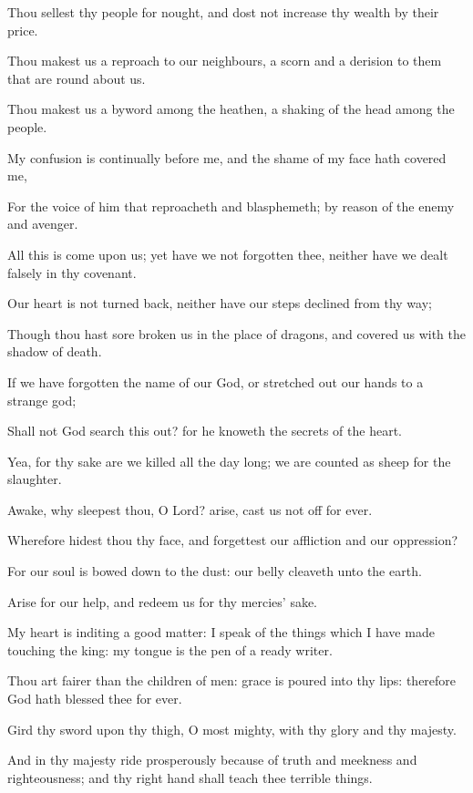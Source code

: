 \Verse Thou sellest thy people for nought, and dost not increase thy wealth by their price.

\Verse Thou makest us a reproach to our neighbours, a scorn and a derision to them that are round about us.

\Verse Thou makest us a byword among the heathen, a shaking of the head among the people.

\Verse My confusion is continually before me, and the shame of my face hath covered me,

\Verse For the voice of him that reproacheth and blasphemeth; by reason of the enemy and avenger.

\Verse All this is come upon us; yet have we not forgotten thee, neither have we dealt falsely in thy covenant.

\Verse Our heart is not turned back, neither have our steps declined from thy way;

\Verse Though thou hast sore broken us in the place of dragons, and covered us with the shadow of death.

\Verse If we have forgotten the name of our God, or stretched out our hands to a strange god;

\Verse Shall not God search this out? for he knoweth the secrets of the heart.

\Verse Yea, for thy sake are we killed all the day long; we are counted as sheep for the slaughter.

\Verse Awake, why sleepest thou, O Lord? arise, cast us not off for ever.

\Verse Wherefore hidest thou thy face, and forgettest our affliction and our oppression?

\Verse For our soul is bowed down to the dust: our belly cleaveth unto the earth.

\Verse Arise for our help, and redeem us for thy mercies' sake.




\Chapter
\Verse My heart is inditing a good matter: I speak of the things which I have made touching the king: my tongue is the pen of a ready writer.

\Verse Thou art fairer than the children of men: grace is poured into thy lips: therefore God hath blessed thee for ever.

\Verse Gird thy sword upon thy thigh, O most mighty, with thy glory and thy majesty.

\Verse And in thy majesty ride prosperously because of truth and meekness and righteousness; and thy right hand shall teach thee terrible things.

